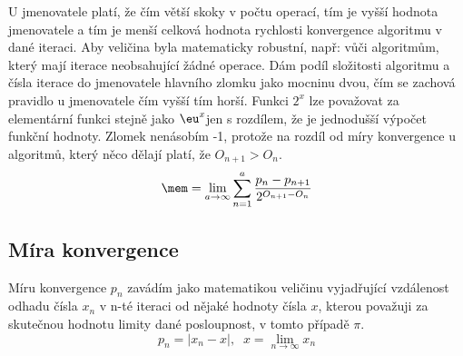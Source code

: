 \documentclass[rocnikovka]{gzwroc} %
\begin{document}
U jmenovatele platí, že čím větší skoky v počtu operací, tím je vyšší hodnota jmenovatele a tím je menší celková hodnota rychlosti konvergence algoritmu v dané iteraci. Aby veličina byla matematicky robustní, např: vůči algoritmům, který mají iterace neobsahující žádné operace. Dám podíl složitosti algoritmu a čísla iterace do jmenovatele hlavního zlomku jako mocninu dvou, čím se zachová pravidlo u jmenovatele čím vyšší tím horší. Funkci $2^x$ lze považovat za elementární funkci stejně jako $\eu^x$jen s rozdílem, že je jednodušší výpočet funkční hodnoty. Zlomek nenásobím -1, protože na rozdíl od míry konvergence u algoritmů, který něco dělají platí, že $O_{n+1}>O_n$.
\begin{equation}
\mem=\lim_{a\to\infty} \sum_{n=1}^{a}\frac{p_n-p_{n+1}}{2^{O_{n+1}-O_n}}
\end{equation}

\subsection{Míra konvergence}
Míru konvergence $p_n$ zavádím jako matematikou veličinu vyjadřující vzdálenost odhadu čísla $x_n$ v n-té iteraci od nějaké hodnoty čísla $x$, kterou považuji za skutečnou hodnotu limity dané posloupnost, v tomto případě $\pi$.
$$
p_n=|x_n-x|, \;\; x=\lim_{n\to\infty} x_n
$$

\end{document}
